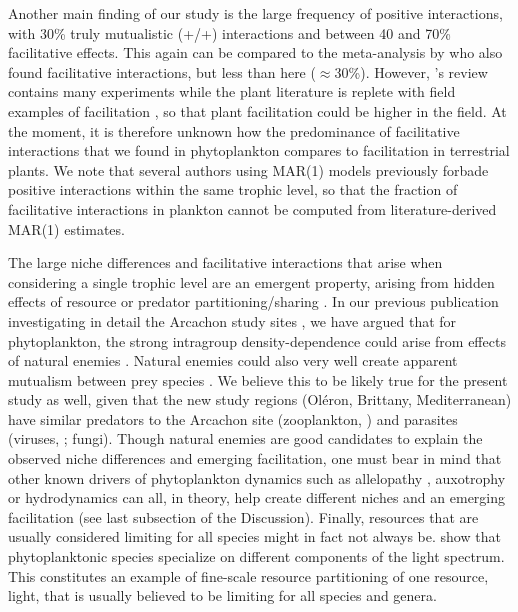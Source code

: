 \documentclass[10pt]{article}
\begin{document}
Another main finding of our study is the large frequency of positive
interactions, with 30\% truly mutualistic (+/+) interactions and between
40 and 70\% facilitative effects. This again can be compared to the
meta-analysis by \citet{adler_competition_2018} who also found facilitative
interactions, but less than here ($\approx$30\%). However, \citet{adler_competition_2018}'s
review contains many experiments while the plant literature is replete
with field examples of facilitation \citep{brooker_facilitation_2008,mcintire2014facilitation},
so that plant facilitation could be higher in the field. At the moment,
it is therefore unknown how the predominance of facilitative interactions
that we found in phytoplankton compares to facilitation in terrestrial
plants. We note that several authors using MAR(1) models previously
forbade positive interactions within the same trophic level, so that
the fraction of facilitative interactions in plankton cannot be computed
from literature-derived MAR(1) estimates.

The large niche differences and facilitative interactions that arise
when considering a single trophic level are an emergent property,
arising from hidden effects of resource or predator partitioning/sharing
\citep{chesson_updates_2018}. In our previous publication investigating
in detail the Arcachon study sites \citep{barraquand_coastal_2018},
we have argued that for phytoplankton, the strong intragroup density-dependence
could arise from effects of natural enemies \citep{haydon_pivotal_1994,barraquand_coastal_2018}.
Natural enemies could also very well create apparent mutualism between
prey species \citep{abrams_apparent_1998,barraquand_indirect_2015,de_ruiter_emergent_2017}.
We believe this to be likely true for the present study as well, given
that the new study regions (Oléron, Brittany, Mediterranean) have
similar predators to the Arcachon site (zooplankton, \citealp[e.g.,][]{jamet_zooplankton_2001,moderan_zooplankton_2010,tortajada_network_2012})
and parasites (viruses, \citealp[e.g.,][]{ory_pelagic_2010};
fungi). Though natural enemies are good candidates to explain the
observed niche differences and emerging facilitation, one must bear
in mind that other known drivers of phytoplankton dynamics such as
allelopathy \citep{felpeto_allelopathy_2018}, auxotrophy \citep{tang_most_2010}
or hydrodynamics \citep{levy_role_2018} can all, in theory, help
create different niches and an emerging facilitation (see last subsection
of the Discussion). Finally, resources that are usually considered
limiting for all species might in fact not always be. \citet{burson_competition_2018} show that phytoplanktonic species specialize on different components of the light spectrum. This constitutes an example of fine-scale resource partitioning of one resource,
light, that is usually believed to be limiting for all species and
genera.
\end{document}
